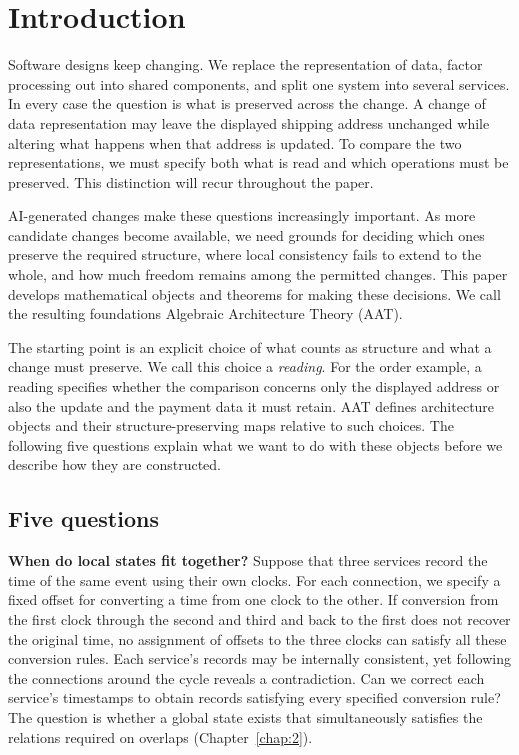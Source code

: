 \chapter*{Introduction}

Software designs keep changing. We replace the representation of data, factor
processing out into shared components, and split one system into several
services. In every case the question is what is preserved across the change.
A change of data representation may leave the displayed shipping address
unchanged while altering what happens when that address is updated. To compare
the two representations, we must specify both what is read and which operations
must be preserved. This distinction will recur throughout the paper.

AI-generated changes make these questions increasingly important. As more
candidate changes become available, we need grounds for deciding which ones
preserve the required structure, where local consistency fails to extend to
the whole, and how much freedom remains among the permitted changes. This
paper develops mathematical objects and theorems for making these decisions.
We call the resulting foundations Algebraic Architecture Theory (AAT).

The starting point is an explicit choice of what counts as structure and what
a change must preserve. We call this choice a \emph{reading}. For the order
example, a reading specifies whether the comparison concerns only the displayed
address or also the update and the payment data it must retain. AAT defines
architecture objects and their structure-preserving maps relative to such
choices. The following five questions explain what we want to do with these
objects before we describe how they are constructed.

\section*{Five questions}

\textbf{When do local states fit together?}
Suppose that three services record the time of the same event using their own
clocks. For each connection, we specify a fixed offset for converting a time
from one clock to the other. If conversion from the first clock through the
second and third and back to the first does not recover the original time,
no assignment of offsets to the three clocks can satisfy all these conversion
rules. Each service's records may be internally consistent, yet following the
connections around the cycle reveals a contradiction. Can we correct each
service's timestamps to obtain records satisfying every specified conversion
rule? The question is whether a global state exists that simultaneously
satisfies the relations required on overlaps (Chapter~\ref{chap:2}).


